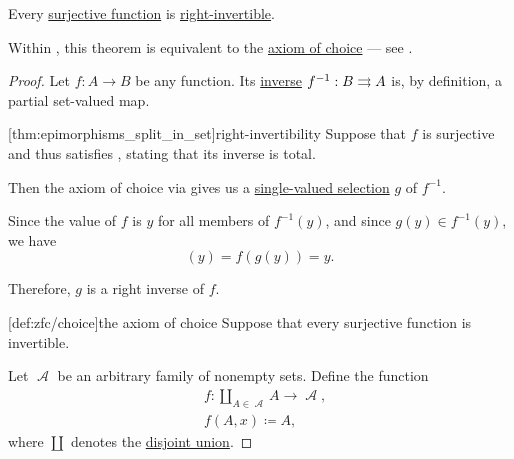 \begin{theorem}\label{thm:surjective_functions_are_right_invertible}
  Every \hyperref[def:function_invertibility/surjective]{surjective function} is \hyperref[def:morphism_invertibility/right_invertible]{right-invertible}.
\end{theorem}
\begin{comments}
  \item Within \hyperref[def:zfc]{}, this theorem is equivalent to the \hyperref[def:zfc/choice]{axiom of choice} --- see .
\end{comments}
\begin{proof}
  Let \( f: A \to B \) be any function. Its \hyperref[def:set_valued_map/inverse]{inverse} \( f^{-1}: B \rightrightarrows A \) is, by definition, a partial set-valued map.

  [thm:epimorphisms_split_in_set]{right-invertibility} Suppose that \( f \) is surjective and thus satisfies , stating that its inverse is total.

  Then the axiom of choice via  gives us a \hyperref[def:function/selection]{single-valued selection} \( g \) of \( f^{-1} \).

  Since the value of \( f \) is \( y \) for all members of \( f^{-1}(y) \), and since \( g(y) \in f^{-1}(y) \), we have
  \begin{equation*}
    [f \bincirc g](y) = f(g(y)) = y.
  \end{equation*}

  Therefore, \( g \) is a right inverse of \( f \).

  [def:zfc/choice]{the axiom of choice} Suppose that every surjective function is invertible.

  Let \( \mscrA \) be an arbitrary family of nonempty sets. Define the function
  \begin{equation*}
    \begin{aligned}
      &f: \coprod_{A \in \mscrA} A \to \mscrA, \\
      &f(A, x) \coloneqq A,
    \end{aligned}
  \end{equation*}
  where \( \coprod \) denotes the \hyperref[def:disjoint_union]{disjoint union}.


\end{proof}
